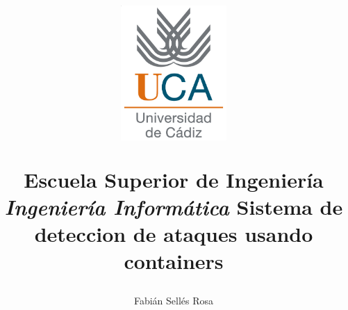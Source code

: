 \documentclass{scrbook}
\author{Fabián Sellés Rosa}
\title{\begin{center} \includegraphics[width=0.3\textwidth]{images/logouca} \end{center} \vfill{} \textbf{\huge{Escuela Superior de Ingeniería}} \vfill{} \textit{Ingeniería Informática} \vfill{} Sistema de deteccion de ataques usando containers \\ }
\date{}
\begin{document}
\newcommand{\parrafo}[1]{\vspace{20pt}\underline{\textbf{#1}}}

\maketitle


\tableofcontents{}
\listoffigures{}



\appendix







\end{document}

